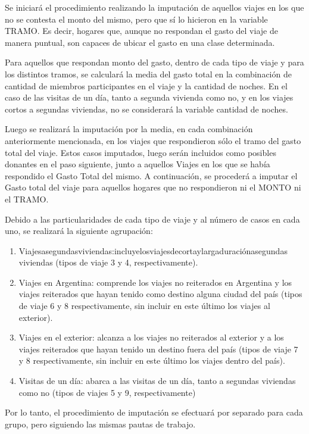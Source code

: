 \documentclass[
  openany]{book}
\begin{document}
Se iniciará el procedimiento realizando la imputación de aquellos viajes en los que no se contesta el monto del mismo, pero que sí lo hicieron en la variable TRAMO. Es decir, hogares que, aunque no respondan el gasto del viaje de manera puntual, son capaces de ubicar el gasto en una clase determinada.

Para aquellos que respondan monto del gasto, dentro de cada tipo de viaje y para los distintos tramos, se calculará la media del gasto total en la combinación de cantidad de miembros participantes en el viaje y la cantidad de noches. En el caso de las visitas de un día, tanto a segunda vivienda como no, y en los viajes cortos a segundas viviendas, no se considerará la variable cantidad de noches.

Luego se realizará la imputación por la media, en cada combinación anteriormente mencionada, en los viajes que respondieron sólo el tramo del gasto total del viaje. Estos casos imputados, luego serán incluidos como posibles donantes en el paso siguiente, junto a aquellos Viajes en los que se había respondido el Gasto Total del mismo. A continuación, se procederá a imputar el Gasto total del viaje para aquellos hogares que no respondieron ni el MONTO ni el TRAMO.

Debido a las particularidades de cada tipo de viaje y al número de casos en cada uno, se realizará la siguiente agrupación:

\begin{enumerate}
\def\labelenumi{\arabic{enumi}.}
\item
  Viajesasegundasviviendas:incluyelosviajesdecortaylargaduraciónasegundas viviendas (tipos de viaje 3 y 4, respectivamente).
\item
  Viajes en Argentina: comprende los viajes no reiterados en Argentina y los viajes reiterados que hayan tenido como destino alguna ciudad del país (tipos de viaje 6 y 8 respectivamente, sin incluir en este último los viajes al exterior).
\item
  Viajes en el exterior: alcanza a los viajes no reiterados al exterior y a los viajes reiterados que hayan tenido un destino fuera del país (tipos de viaje 7 y 8 respectivamente, sin incluir en este último los viajes dentro del país).
\item
  Visitas de un día: abarca a las visitas de un día, tanto a segundas viviendas como no (tipos de viajes 5 y 9, respectivamente)
\end{enumerate}

Por lo tanto, el procedimiento de imputación se efectuará por separado para cada grupo, pero siguiendo las mismas pautas de trabajo.
\end{document}
